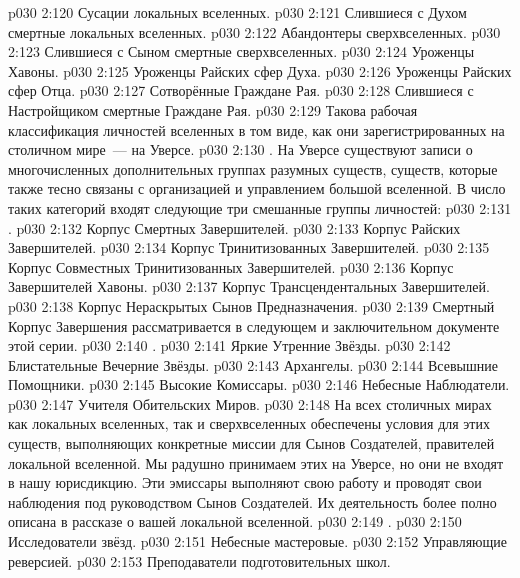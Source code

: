 \vs p030 2:120 Сусации локальных вселенных.
\vs p030 2:121 Слившиеся с Духом смертные локальных вселенных.
\vs p030 2:122 Абандонтеры сверхвселенных.
\vs p030 2:123 Слившиеся с Сыном смертные сверхвселенных.
\vs p030 2:124 Уроженцы Хавоны.
\vs p030 2:125 Уроженцы Райских сфер Духа.
\vs p030 2:126 Уроженцы Райских сфер Отца.
\vs p030 2:127 Сотворённые Граждане Рая.
\vs p030 2:128 Слившиеся с Настройщиком смертные Граждане Рая.
\vs p030 2:129 \pc Такова рабочая классификация личностей вселенных в том виде, как они зарегистрированных на столичном мире~--- на Уверсе.
\vs p030 2:130 \pc {}. На Уверсе существуют записи о многочисленных дополнительных группах разумных существ, существ, которые также тесно связаны с организацией и управлением большой вселенной. В число таких категорий входят следующие три смешанные группы личностей:
\vs p030 2:131 .
\vs p030 2:132 Корпус Смертных Завершителей.
\vs p030 2:133 Корпус Райских Завершителей.
\vs p030 2:134 Корпус Тринитизованных Завершителей.
\vs p030 2:135 Корпус Совместных Тринитизованных Завершителей.
\vs p030 2:136 Корпус Завершителей Хавоны.
\vs p030 2:137 Корпус Трансцендентальных Завершителей.
\vs p030 2:138 Корпус Нераскрытых Сынов Предназначения.
\vs p030 2:139 \pc Смертный Корпус Завершения рассматривается в следующем и заключительном документе этой серии.
\vs p030 2:140 .
\vs p030 2:141 Яркие Утренние Звёзды.
\vs p030 2:142 Блистательные Вечерние Звёзды.
\vs p030 2:143 Архангелы.
\vs p030 2:144 Всевышние Помощники.
\vs p030 2:145 Высокие Комиссары.
\vs p030 2:146 Небесные Наблюдатели.
\vs p030 2:147 Учителя Обительских Миров.
\vs p030 2:148 \pc На всех столичных мирах как локальных вселенных, так и сверхвселенных обеспечены условия для этих существ, выполняющих конкретные миссии для Сынов Создателей, правителей локальной вселенной. Мы радушно принимаем этих  на Уверсе, но они не входят в нашу юрисдикцию. Эти эмиссары выполняют свою работу и проводят свои наблюдения под руководством Сынов Создателей. Их деятельность более полно описана в рассказе о вашей локальной вселенной.
\vs p030 2:149 .
\vs p030 2:150 Исследователи звёзд.
\vs p030 2:151 Небесные мастеровые.
\vs p030 2:152 Управляющие реверсией.
\vs p030 2:153 Преподаватели подготовительных школ.
